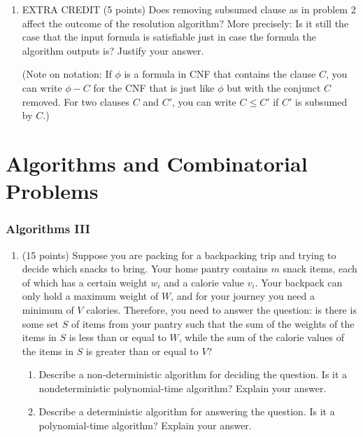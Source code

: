 \documentclass[english]{article}
\theoremstyle{definition}
\begin{document}
\begin{enumerate}[label=\arabic*.,ref=\arabic*,resume]
\item EXTRA CREDIT (5 points) Does removing subsumed clause as in problem 2 affect the outcome of the resolution algorithm? More precisely: Is it still the case that the input formula is satisfiable just in case the formula the algorithm outputs is? Justify your answer. 

(Note on notation: If $\phi$ is a formula in CNF that contains the clause $C$, you can write $\phi - C$ for the CNF that is just like $\phi$ but with the conjunct $C$ removed. For two clauses $C$ and $C'$, you can write $C \leq C'$ if $C'$ is subsumed by $C$.)

\end{enumerate}

\setcounter{subsection}{2}

\section{Algorithms and Combinatorial Problems}

\setcounter{subsubsection}{2}

\subsubsection{Algorithms III}
\begin{enumerate}[label=\arabic*.,ref=\arabic*,resume]
\item (15 points) Suppose you are packing for a backpacking trip and trying to decide which snacks to bring. Your home pantry contains $m$ snack items, each of which has a certain weight $w_i$ and a calorie value $v_i$. Your backpack can only hold a maximum weight of $W$, and for your journey you need a minimum of $V$ calories. Therefore, you need to answer the question: is there is some set $S$ of items from your pantry such that the sum of the weights of the items in $S$ is less than or equal to $W$, while the sum of the calorie values of the items in $S$ is greater than or equal to $V$? 
\begin{enumerate}
\item Describe a non-deterministic algorithm for deciding the question. Is it a nondeterministic polynomial-time algorithm? Explain your answer. 
\item Describe a deterministic algorithm for answering the question. Is it a polynomial-time algorithm? Explain your answer.
\end{enumerate}
\end{enumerate}
\end{document}
